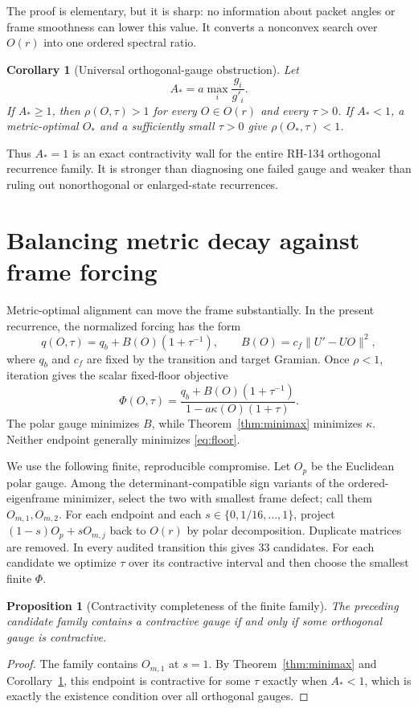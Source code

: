 \documentclass[12pt]{article}
\newtheorem{corollary}[theorem]{Corollary}
\newtheorem{proposition}[theorem]{Proposition}
\begin{document}
The proof is elementary, but it is sharp: no information about packet angles
or frame smoothness can lower this value.  It converts a nonconvex search over
$O(r)$ into one ordered spectral ratio.

\begin{corollary}[Universal orthogonal-gauge obstruction]\label{cor:wall}
Let
\[
 A_*=a\max_i\frac{g_i}{g'_i}.
\]
If $A_*\geq1$, then $\rho(O,\tau)>1$ for every $O\in O(r)$ and every
$\tau>0$.  If $A_*<1$, a metric-optimal $O_*$ and a sufficiently small
$\tau>0$ give $\rho(O_*,\tau)<1$.
\end{corollary}

Thus $A_*=1$ is an exact contractivity wall for the entire RH-134 orthogonal
recurrence family.  It is stronger than diagnosing one failed gauge and
weaker than ruling out nonorthogonal or enlarged-state recurrences.

\section{Balancing metric decay against frame forcing}
Metric-optimal alignment can move the frame substantially.  In the present
recurrence, the normalized forcing has the form
\[
 q(O,\tau)=q_b+B(O)(1+\tau^{-1}),
 \qquad
 B(O)=c_f\|U'-UO\|^2,
\]
where $q_b$ and $c_f$ are fixed by the transition and target Gramian.  Once
$\rho<1$, iteration gives the scalar fixed-floor objective
\begin{equation}\label{eq:floor}
 \Phi(O,\tau)=\frac{q_b+B(O)(1+\tau^{-1})}
 {1-a\kappa(O)(1+\tau)}.
\end{equation}
The polar gauge minimizes $B$, while Theorem~\ref{thm:minimax} minimizes
$\kappa$.  Neither endpoint generally minimizes \eqref{eq:floor}.

We use the following finite, reproducible compromise.  Let $O_p$ be the
Euclidean polar gauge.  Among the determinant-compatible sign variants of
the ordered-eigenframe minimizer, select the two with smallest frame defect;
call them $O_{m,1},O_{m,2}$.  For each endpoint and each
$s\in\{0,1/16,\ldots,1\}$, project
$(1-s)O_p+sO_{m,j}$ back to $O(r)$ by polar decomposition.  Duplicate
matrices are removed.  In every audited transition this gives 33 candidates.
For each candidate we optimize $\tau$ over its contractive interval and then
choose the smallest finite $\Phi$.

\begin{proposition}[Contractivity completeness of the finite family]
The preceding candidate family contains a contractive gauge if and only if
some orthogonal gauge is contractive.
\end{proposition}
\begin{proof}
The family contains $O_{m,1}$ at $s=1$.  By
Theorem~\ref{thm:minimax} and Corollary~\ref{cor:wall}, this endpoint is
contractive for some $\tau$ exactly when $A_*<1$, which is exactly the
existence condition over all orthogonal gauges.
\end{proof}
\end{document}
